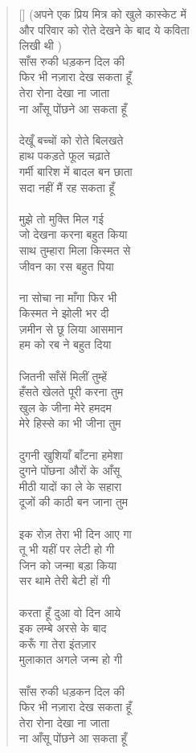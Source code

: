 \begin{verse}[\versewidth]\texthindi{
(अपने एक प्रिय मित्र को खुले कास्केट में\\
और परिवार को रोते देखने के बाद ये कविता\\
लिखी थी
)\\
साँस रुकी धड़कन दिल की\\
फिर भी नज़ारा देख सकता हूँ\\
तेरा रोना देखा ना जाता\\
ना आँसू पोंछने आ सकता हूँ\\
\\
देखूँ बच्चों को रोते बिलखते\\
हाथ पकड़ते फूल चढ़ाते\\
गर्मी बारिश में बादल बन छाता\\
सदा नहीं मैं रह सकता हूँ\\
\\
मुझे तो मुक्ति मिल गई\\
जो देखना करना बहुत किया\\
साथ तुम्हारा मिला किस्मत से\\
जीवन का रस बहुत पिया\\
\\
ना सोचा ना माँगा फिर भी\\
किस्मत ने झोली भर दी\\
ज़मीन से छू लिया आसमान\\
हम को रब ने बहुत दिया\\
\\
जितनी साँसें मिलीं तुम्हें\\
हँसते खेलते पूरी करना तुम\\
खुल के जीना मेरे हमदम\\
मेरे हिस्से का भी जीना तुम\\
\\
दुगनी खुशियाँ बाँटना हमेशा\\
दुगने पोंछना औरों के आँसू\\
मीठी यादों का ले के सहारा\\
दूजों की काठी बन जाना तुम\\
\\
इक रोज़ तेरा भी दिन आए गा\\
तू भी यहीं पर लेटी हो गी\\
जिन को जन्मा बड़ा किया\\
सर थामे तेरी बेटी हों गी\\
\\
करता हूँ दुआ वो दिन आये\\
इक लम्बे अरसे के बाद\\
करूँ गा तेरा इंतज़ार\\
मुलाकात अगले जन्म हो गी\\
\\
साँस रुकी धड़कन दिल की\\
फिर भी नज़ारा देख सकता हूँ\\
तेरा रोना देखा ना जाता\\
ना आँसू पोंछने आ सकता हूँ
}\end{verse}

